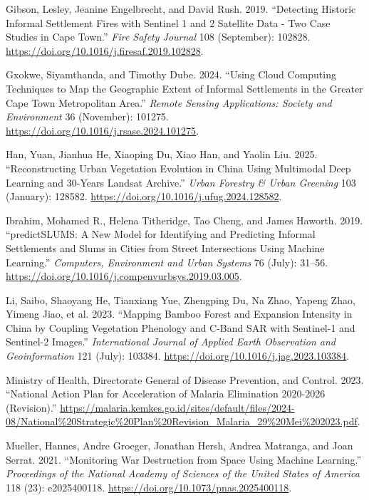 \documentclass[
  letterpaper,
  DIV=11,
  numbers=noendperiod]{scrreprt}
\newlength{\cslhangindent}
\newlength{\cslentryspacingunit} %
\newenvironment{CSLReferences}[2] %
 {%
  \setlength{\parindent}{0pt}
  \ifodd #1
  \let\oldpar\par
  \def\par{\hangindent=\cslhangindent\oldpar}
  \fi
  \setlength{\parskip}{#2\cslentryspacingunit}
 }%
 {}
\begin{document}
\begin{CSLReferences}{1}{0}
\leavevmode{}%
Gibson, Lesley, Jeanine Engelbrecht, and David Rush. 2019. {``Detecting
Historic Informal Settlement Fires with Sentinel 1 and 2 Satellite Data
- Two Case Studies in Cape Town.''} \emph{Fire Safety Journal} 108
(September): 102828.
\url{https://doi.org/10.1016/j.firesaf.2019.102828}.

\leavevmode{}%
Gxokwe, Siyamthanda, and Timothy Dube. 2024. {``Using Cloud Computing
Techniques to Map the Geographic Extent of Informal Settlements in the
Greater Cape Town Metropolitan Area.''} \emph{Remote Sensing
Applications: Society and Environment} 36 (November): 101275.
\url{https://doi.org/10.1016/j.rsase.2024.101275}.

\leavevmode{}%
Han, Yuan, Jianhua He, Xiaoping Du, Xiao Han, and Yaolin Liu. 2025.
{``Reconstructing Urban Vegetation Evolution in China Using Multimodal
Deep Learning and 30-Years Landsat Archive.''} \emph{Urban Forestry \&
Urban Greening} 103 (January): 128582.
\url{https://doi.org/10.1016/j.ufug.2024.128582}.

\leavevmode{}%
Ibrahim, Mohamed R., Helena Titheridge, Tao Cheng, and James Haworth.
2019. {``predictSLUMS: A New Model for Identifying and Predicting
Informal Settlements and Slums in Cities from Street Intersections Using
Machine Learning.''} \emph{Computers, Environment and Urban Systems} 76
(July): 31--56.
\url{https://doi.org/10.1016/j.compenvurbsys.2019.03.005}.

\leavevmode{}%
Li, Saibo, Shaoyang He, Tianxiang Yue, Zhengping Du, Na Zhao, Yapeng
Zhao, Yimeng Jiao, et al. 2023. {``Mapping Bamboo Forest and Expansion
Intensity in China by Coupling Vegetation Phenology and C-Band SAR with
Sentinel-1 and Sentinel-2 Images.''} \emph{International Journal of
Applied Earth Observation and Geoinformation} 121 (July): 103384.
\url{https://doi.org/10.1016/j.jag.2023.103384}.

\leavevmode{}%
Ministry of Health, Directorate General of Disease Prevention, and
Control. 2023. {``National Action Plan for Acceleration of Malaria
Elimination 2020-2026 (Revision).''}
\url{https://malaria.kemkes.go.id/sites/default/files/2024-08/National\%20Strategic\%20Plan\%20Revision_Malaria_29\%20Mei\%202023.pdf}.

\leavevmode{}%
Mueller, Hannes, Andre Groeger, Jonathan Hersh, Andrea Matranga, and
Joan Serrat. 2021. {``Monitoring War Destruction from Space Using
Machine Learning.''} \emph{Proceedings of the National Academy of
Sciences of the United States of America} 118 (23): e2025400118.
\url{https://doi.org/10.1073/pnas.2025400118}.


\end{CSLReferences}
\end{document}
